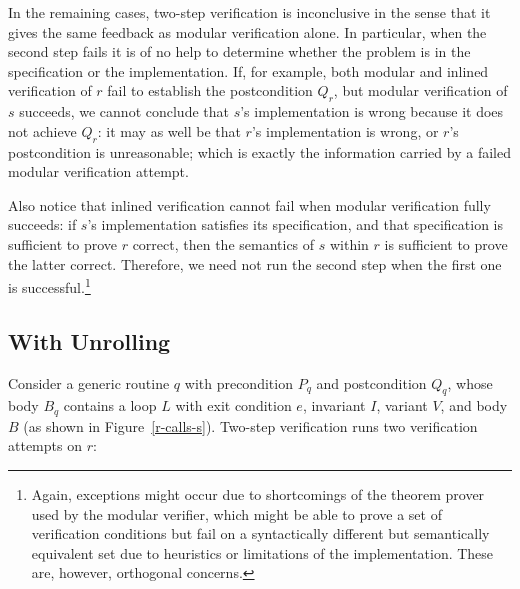 In the remaining cases, two-step verification is inconclusive in the sense that it gives the same feedback as modular verification alone.
In particular, when the second step fails it is of no help to determine whether the problem is in the specification or the implementation.
If, for example, both modular and inlined verification of $r$ fail to establish the postcondition $Q_r$, but modular verification of $s$ succeeds, we cannot conclude that $s$'s implementation is wrong because it does not achieve $Q_r$: it may as well be that $r$'s implementation is wrong, or $r$'s postcondition is unreasonable; which is exactly the information carried by a failed modular verification attempt.

Also notice that inlined verification cannot fail when modular verification fully succeeds: if $s$'s implementation satisfies its specification, and that specification is sufficient to prove $r$ correct, then the semantics of $s$ within $r$ is sufficient to prove the latter correct.
Therefore, we need not run the second step when the first one is successful.\footnote{Again, exceptions might occur due to shortcomings of the theorem prover used by the modular verifier, which might be able to prove a set of verification conditions but fail on a syntactically different but semantically equivalent set due to heuristics or limitations of the implementation. These are, however, orthogonal concerns.}





\subsection{With Unrolling} \label{sec:with-unrolling}

Consider a generic routine $q$ with precondition $P_q$ and postcondition $Q_q$, whose body $B_q$ contains a loop $L$ with exit condition $e$, invariant $I$, variant $V$, and body $B$ (as shown in Figure~\ref{r-calls-s}).
Two-step verification runs two verification attempts on $r$:


